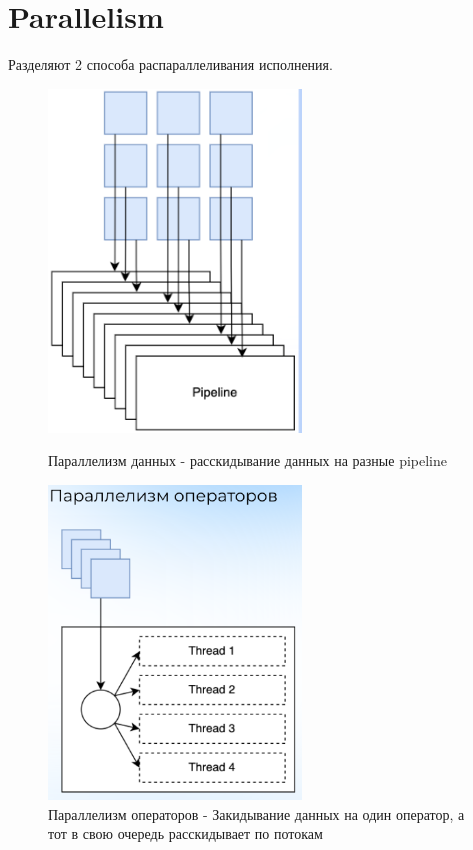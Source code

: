 \documentclass[11pt]{article}
\begin{document}
    \newpage


    \section{Parallelism}

    Разделяют 2 способа распараллеливания исполнения.

    \begin{figure}[h!]
        \begin{minipage}{0.5\textwidth}
            \centering
            \includegraphics[width=0.6\textwidth]{Pictures/Push/Parallelism/Data Parallelism}
            \caption{Параллелизм данных - расскидывание данных на разные pipeline}
        \end{minipage}
        \begin{minipage}{0.5\textwidth}
            \centering
            \includegraphics[width=0.6\textwidth]{Pictures/Push/Parallelism/Operator Parallelism}
            \caption{Параллелизм операторов - Закидывание данных на один оператор, а тот в свою очередь расскидывает по потокам}
        \end{minipage}
    \end{figure}
\end{document}
